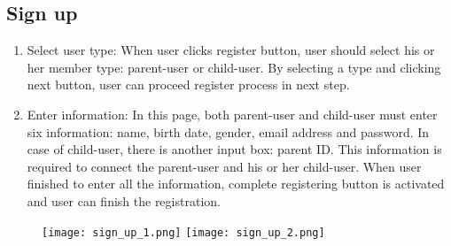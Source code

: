 \documentclass[conference]{IEEEtran}
\begin{document}
\subsection{Sign up}
    \begin{enumerate}
    \item Select user type: When user clicks register button, user should select his or her member type: parent-user or child-user. By selecting a type and clicking next button, user can proceed register process in next step.
    \item Enter information: In this page, both parent-user and child-user must enter six information: name, birth date, gender, email address and password. In case of child-user, there is another input box: parent ID. This information is required to connect the parent-user and his or her child-user. When user finished to enter all the information, complete registering button is activated and user can finish the registration.
    \end{enumerate}
    \begin{figure}[H]
    \centering
    \texttt{[image: sign\_up\_1.png]}
    \texttt{[image: sign\_up\_2.png]}
    \end{figure}
    
\end{document}
